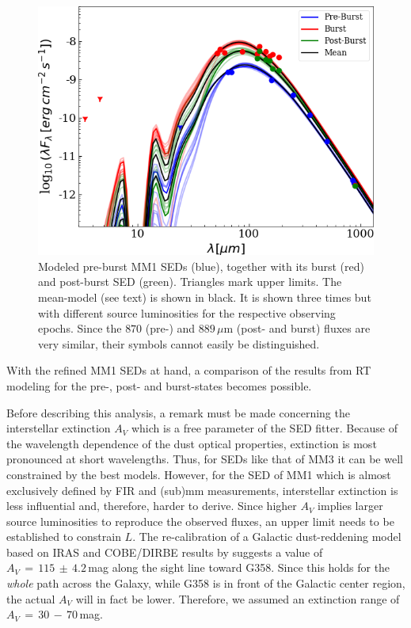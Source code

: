 \begin{figure}   %
    \sidecaption
	\includegraphics[width=12cm]{G358_ap3_mean.png}
	\caption{Modeled pre-burst MM1 SEDs (blue), together with its burst (red) and post-burst SED (green). Triangles mark upper limits. The mean-model (see text) is shown in black. It is shown three times but with different source luminosities for the respective observing epochs. 
	Since the $870$ (pre-) and $889\,\mu$m (post- and burst) fluxes are very similar, their symbols cannot easily be distinguished.%
	}
 \label{fig:sed g358}
\end{figure}

With the refined MM1 SEDs at hand, a comparison of the results from RT modeling for the pre-, post- and burst-states becomes possible.

Before describing this analysis, a remark must be made concerning the interstellar extinction $A_V$ which is a free parameter of the SED fitter. Because of the wavelength dependence of the dust optical properties, extinction is most pronounced at short wavelengths. Thus, for SEDs like that of MM3 it can be well constrained by the best models. However, for the SED of MM1 which is almost exclusively defined by FIR and (sub)mm measurements, interstellar extinction is less influential and, therefore, harder to derive. Since higher $A_V$ implies larger source luminosities to reproduce the observed fluxes, an upper limit needs to be established to constrain $L$. The re-calibration of a Galactic dust-reddening model based on IRAS and COBE/DIRBE results by \citet{2011ApJ...737..103S} suggests a value of $A_V\,{=}\,115\,{\pm}\,4.2$\,mag along the sight line toward G358. Since this holds for the {\em whole} path across the Galaxy, while G358 is in front of the Galactic center region, the actual $A_V$ will in fact be lower. Therefore, we assumed an extinction range of $A_V\,{=}\,30\,{-}\,70$\,mag.


